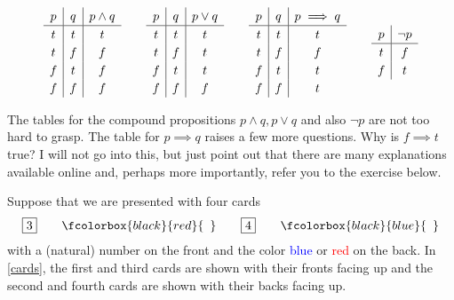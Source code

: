 \documentclass{article}
\begin{document}
\begin{equation*}[emph]
\def\arraystretch{1.2}
      \begin{array}{c|c|c}
        p & q  & p\land q  \\
        \hline 
        t & t  & t    \\
        t & f & f\\
        f & t & f\\
        f & f & f
      \end{array}\qquad
      \begin{array}{c|c|c}
        p & q  & p\lor q  \\
        \hline
        t & t  & t    \\
        t & f & t\\
        f & t & t\\
        f & f & f
      \end{array}
      \qquad
      \begin{array}{c|c|c}
        p & q  & p\implies q  \\
        \hline
        t & t  & t    \\
        t & f & f\\
        f & t & t\\
        f & f & t
      \end{array}\qquad
      \begin{array}{c|c}
        p & \neg p \\
        \hline
        t & f\\
        f & t
      \end{array}
  \end{equation*}


The tables for the compound propositions $p\land q, p\lor q$ and also
$\neg p$ are not too hard to grasp. The table for $p\implies q$ 
raises a few more questions. Why is $f\implies t$ true?
I will not go into this, but just point out that there are
many explanations available online and, 
perhaps more importantly, refer you to the exercise below.



\beginshex
Suppose that we are presented with four cards
\begin{equation}\label{cards}
\boxed{3}\qquad \fcolorbox{black}{red}{\phantom{3}}
\qquad\boxed{4}\qquad \fcolorbox{black}{blue}{\phantom{4}}
\end{equation}
with a (natural) number on the front and the color
\textcolor{blue}{blue} or \textcolor{red}{red} on the back.
In \eqref{cards}, the first and third cards are shown with their fronts facing up and
the second and fourth cards are shown with their backs facing up.
\end{document}
